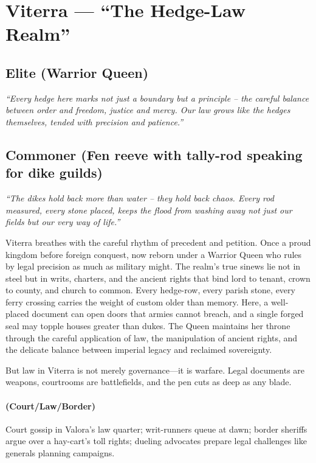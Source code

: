 \section{Viterra --- ``The Hedge-Law Realm''}
\label{chap:viterra}

\subsection*{Elite (Warrior Queen)}
\textit{``Every hedge here marks not just a boundary but a principle – the careful balance between order and freedom, justice and mercy. Our law grows like the hedges themselves, tended with precision and patience.''}

\subsection*{Commoner (Fen reeve with tally-rod speaking for dike guilds)}
\textit{``The dikes hold back more than water – they hold back chaos. Every rod measured, every stone placed, keeps the flood from washing away not just our fields but our very way of life.''}

\begin{tcolorbox}[colback=black!3,colframe=black!40!white,title={Theme \& Atmosphere}]
Viterra breathes with the careful rhythm of precedent and petition. Once a proud kingdom before foreign conquest, now reborn under a Warrior Queen who rules by legal precision as much as military might. The realm's true sinews lie not in steel but in writs, charters, and the ancient rights that bind lord to tenant, crown to county, and church to common. Every hedge-row, every parish stone, every ferry crossing carries the weight of custom older than memory. Here, a well-placed document can open doors that armies cannot breach, and a single forged seal may topple houses greater than dukes. The Queen maintains her throne through the careful application of law, the manipulation of ancient rights, and the delicate balance between imperial legacy and reclaimed sovereignty.

But law in Viterra is not merely governance—it is warfare. Legal documents are weapons, courtrooms are battlefields, and the pen cuts as deep as any blade.
\end{tcolorbox}

\paragraph*{(Court/Law/Border)} Court gossip in Valora's law quarter; writ-runners queue at dawn; border sheriffs argue over a hay-cart's toll rights; dueling advocates prepare legal challenges like generals planning campaigns.

